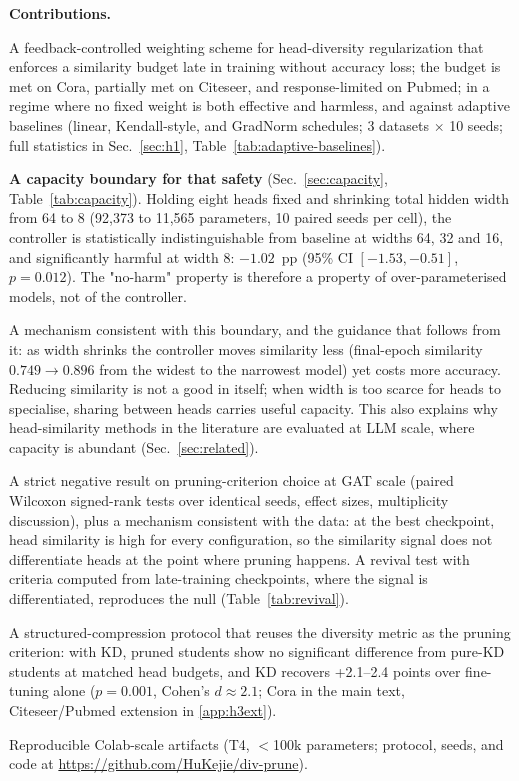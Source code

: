 \documentclass{ws-ijprai}
\begin{document}
\noindent\textbf{Contributions.}
\begin{arabiclist}
\item A feedback-controlled weighting scheme for head-diversity
  regularization that enforces a similarity budget late in training without
  accuracy loss; the budget is met on Cora, partially met on Citeseer, and
  response-limited on Pubmed; in a regime where no fixed weight is both
  effective and harmless, and against adaptive baselines (linear,
  Kendall-style, and GradNorm schedules; 3 datasets $\times$ 10 seeds; full
  statistics in Sec.~\ref{sec:h1}, Table~\ref{tab:adaptive-baselines}).
\item \textbf{A capacity boundary for that safety} (Sec.~\ref{sec:capacity},
  Table~\ref{tab:capacity}). Holding eight heads fixed and shrinking total
  hidden width from 64 to 8 (92{,}373 to 11{,}565 parameters, 10 paired seeds
  per cell), the controller is statistically indistinguishable from baseline
  at widths 64, 32 and 16, and significantly harmful at width 8: $-1.02$~pp
  (95\% CI $[-1.53, -0.51]$, $p=0.012$). The "no-harm" property is therefore
  a property of over-parameterised models, not of the controller.
\item A mechanism consistent with this boundary, and the guidance that follows
  from it: as width shrinks the controller moves similarity less (final-epoch
  similarity $0.749 \to 0.896$ from the widest to the narrowest model) yet
  costs more accuracy. Reducing similarity is not a good in itself; when width
  is too scarce for heads to specialise, sharing between heads carries useful
  capacity. This also explains why head-similarity methods in the literature
  are evaluated at LLM scale, where capacity is abundant
  (Sec.~\ref{sec:related}).
\item A strict negative result on pruning-criterion choice at GAT scale
  (paired Wilcoxon signed-rank tests over identical seeds, effect sizes,
  multiplicity discussion), plus a mechanism consistent with the data: at the
  best checkpoint, head similarity is high for every configuration, so the
  similarity signal does not differentiate heads at the point where pruning
  happens. A revival test with criteria computed from late-training
  checkpoints, where the signal is differentiated, reproduces the null
  (Table~\ref{tab:revival}).
\item A structured-compression protocol that reuses the diversity metric as
  the pruning criterion: with KD, pruned students show no significant
  difference from pure-KD students at matched head budgets, and KD recovers
  +2.1--2.4 points over fine-tuning alone ($p=0.001$, Cohen's $d \approx 2.1$;
  Cora in the main text, Citeseer/Pubmed extension in
  \ref{app:h3ext}).
\item Reproducible Colab-scale artifacts (T4, $<$100k parameters; protocol,
  seeds, and code at \url{https://github.com/HuKejie/div-prune}).
\end{arabiclist}
\end{document}
